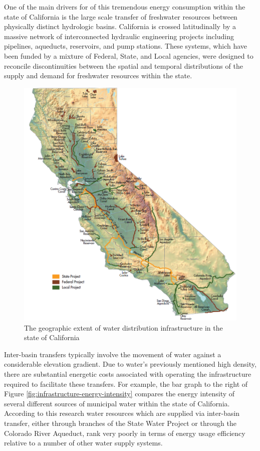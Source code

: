 One of the main drivers for of this tremendous energy consumption within the state of California is the large scale transfer of freshwater resources between physically distinct hydrologic basins. California is crossed latitudinally by a massive network of interconnected hydraulic engineering projects including pipelines, aqueducts, reservoirs, and pump stations. These systems, which have been funded by a mixture of Federal, State, and Local agencies, were designed to reconcile discontinuities between the spatial and temporal distributions of the supply and demand for freshwater resources within the state.

       \begin{figure}[!h]
       \centering
       \includegraphics[width=5.5in]{figures/infrastructure.png}
       \caption[Characteristics of Water Distribution Infrastructure]{The geographic extent of water distribution infrastructure in the state of California \cite{Schwarzenegger2005}}
       \label{fig:california-distribution}
     \end{figure}
    
Inter-basin transfers typically involve the movement of water against a considerable elevation gradient. Due to water's previously mentioned high density, there are substantial energetic costs associated with operating the infrastructure required to facilitate these transfers. For example, the bar graph to the right of Figure \ref{fig:infrastructure-energy-intensity} compares the energy intensity of several different sources of municipal water within the state of California. According to this research water resources which are supplied via inter-basin transfer, either through branches of the State Water Project or through the Colorado River Aqueduct, rank very poorly in terms of energy usage efficiency relative to a number of other water supply systems.

